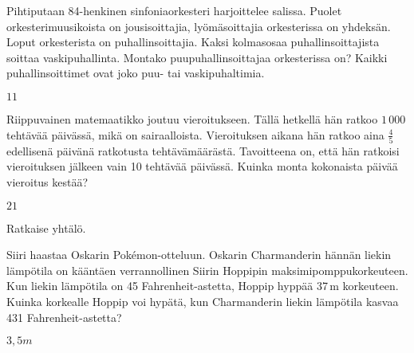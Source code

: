 \begin{tehtava}
	Pihtiputaan 84-henkinen sinfoniaorkesteri harjoittelee salissa. Puolet orkesterimuusikoista on jousisoittajia, lyömäsoittajia orkesterissa on yhdeksän. Loput orkesterista on puhallinsoittajia. Kaksi kolmasosaa puhallinsoittajista soittaa vaskipuhallinta. Montako puupuhallinsoittajaa orkesterissa on? Kaikki puhallinsoittimet ovat joko puu- tai vaskipuhaltimia. 
	

\begin{vastaus}
	$11$
\end{vastaus}
\end{tehtava}

\begin{tehtava}
	Riippuvainen matemaatikko joutuu vieroitukseen. Tällä hetkellä hän ratkoo $1\,000$ tehtävää päivässä, mikä on sairaalloista. Vieroituksen aikana hän ratkoo aina $\frac{4}{5}$ edellisenä päivänä ratkotusta tehtävämäärästä. Tavoitteena on, että hän ratkoisi vieroituksen jälkeen vain 10 tehtävää päivässä. Kuinka monta kokonaista päivää vieroitus kestää?
	

\begin{vastaus}
	$21$
\end{vastaus}
\end{tehtava}

\begin{tehtava}
	Ratkaise yhtälö.
	\begin{alakohdat}
	
	\end{alakohdat}
	

\begin{vastaus}
	\begin{alakohdat}
		\alakohta{$x=-6$}
		\alakohta{$x=-\frac{5}{9}$}
		
	\end{alakohdat}
\end{vastaus}
\end{tehtava}

\begin{tehtava}
	Siiri haastaa Oskarin Pokémon-otteluun. Oskarin Charmanderin hännän liekin lämpötila on kääntäen verrannollinen Siirin Hoppipin maksimipomppukorkeuteen. Kun liekin lämpötila on 45 Fahrenheit-astetta, Hoppip hyppää 37\,m korkeuteen. Kuinka korkealle Hoppip voi hypätä, kun Charmanderin liekin lämpötila kasvaa 431 Fahrenheit-astetta?
	

\begin{vastaus}
	$3,5m$
\end{vastaus}
\end{tehtava}



